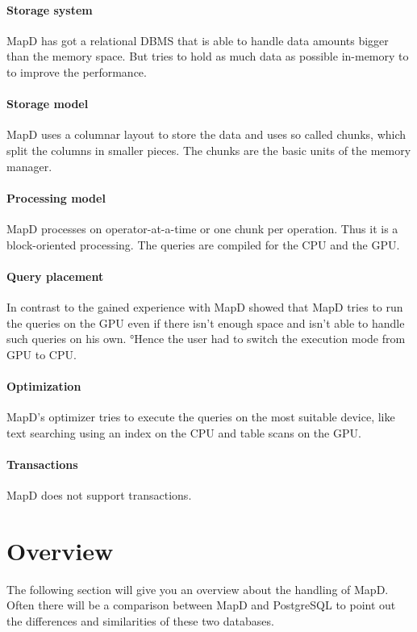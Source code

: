 \paragraph{Storage system} MapD has got a relational DBMS that is able to handle data amounts bigger than the memory space.
But tries to hold as much data as possible in-memory to to improve the performance.
\paragraph{Storage model} MapD uses a columnar layout to store the data and uses so called chunks, which split the columns in smaller pieces.
The chunks are the basic units of the memory manager.
\paragraph{Processing model} MapD processes on operator-at-a-time or one chunk per operation. Thus it is a block-oriented processing.
The queries are compiled for the CPU and the GPU.
\paragraph{Query placement} In contrast to \cite{bress2014gpu} the gained experience with MapD showed that MapD tries to run the queries on the GPU even if there isn't enough space and isn't able to handle such queries on his own.
°Hence the user had to switch the execution mode from GPU to CPU.
\paragraph{Optimization} MapD's optimizer tries to execute the queries on the most suitable device, like text searching using an index on the CPU and table scans on the GPU.
\paragraph{Transactions} MapD does not support transactions.


\newpage
\section{Overview}

The following section will give you an overview about the handling of MapD.
Often there will be a comparison between MapD and PostgreSQL to point out the differences and similarities of these two databases.



